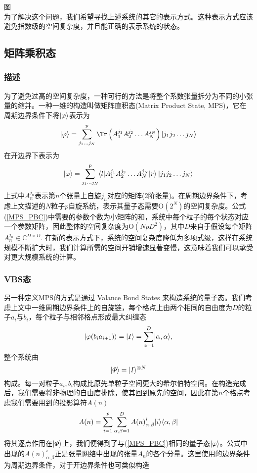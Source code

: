 图\\

为了解决这个问题，我们希望寻找上述系统的其它的表示方式。这种表示方式应该避免指数级的空间复杂度，并且能正确的表示系统的状态。

\subsection{矩阵乘积态}
\subsubsection{描述}

为了避免过高的空间复杂度，一种可行的方法是将整个系数张量拆分为不同的小张量的缩并。一种一维的构造叫做矩阵直积态(Matrix Product State, MPS)，它在周期边界条件下将$\lvert\varphi\rangle$表示为
\begin{equation}\label{MPS_PBC}
\ket{\varphi} = \sum_{j_1\dots j_N}^p \Tr\left( A_{1}^{j_1} A_{2}^{j_2}\dots A_{N}^{j_N} \right)\ket{j_1 j_2\dots j_N}
\end{equation}
在开边界下表示为
\begin{equation}
\lvert\varphi\rangle = \sum_{j_1\dots j_N}^p \langle l\rvert A_{1}^{j_1} A_{2}^{j_2}\dots A_{N}^{j_N}\lvert r\rangle \:
\lvert j_1 j_2\dots j_N\rangle
\end{equation}
上式中$A_n^{j_n}$表示第$n$个张量上自旋$j_n$对应的矩阵(2阶张量)。在周期边界条件下，考虑上文描述的$N$粒子$p$自旋系统，表示其量子态需要$\mathrm{O}\left(2^N\right)$的空间复杂度。公式(\ref{MPS_PBC})中需要的参数个数为小矩阵的和，系统中每个粒子的每个状态对应一个参数矩阵，因此整体的空间复杂度为$\mathrm{O}(NpD^2)$，其中$D$来自于假设每个矩阵$A_{n}^{j_n}\in \mathbb{C}^{D\times D}$. 在新的表示方式下，系统的空间复杂度降低为多项式级，这样在系统规模不断扩大时，我们计算所需的空间开销增速显著变慢，这意味着我们可以承受对更大规模系统的计算。


\subsubsection{VBS态}
另一种定义MPS的方式是通过 Valance Bond States \cite[8]{dongZhangLiangWangLuoSuanFaCongBoSeZiXiTongDaoFeiMiZiXiTong2017}来构造系统的量子态。我们考虑上文中一维周期边界条件上的自旋链，每个格点上由两个相同的自由度为$D$的粒子$a_i$与$b_i$，每个粒子与相邻格点形成最大纠缠态
\begin{equation}
\lvert\varphi(b_i a_{i+1})\rangle = \lvert I\rangle = \sum_{\alpha=1}^D \lvert\alpha,\alpha\rangle,
\end{equation}
整个系统由
\begin{equation}
\lvert\varPhi\rangle = \lvert I\rangle^{\otimes N}
\end{equation}
构成。每一对粒子$a_i,b_i$构成比原先单粒子空间更大的希尔伯特空间。在构造完成后，我们需要将非物理的自由度排除，使其回到原先的空间，因此在第$n$个格点考虑我们需要用到的投影算符$A(n)$
\begin{equation}
A(n) = \sum_{i=1}^p\sum_{\alpha,\beta=1}^D {A(n)}^i_{\alpha,\beta}\lvert i\rangle\langle\alpha,\beta\rvert
\end{equation}
将其逐点作用在$\lvert\varPhi\rangle$上\cite[16]{bridgemanHandwavingInterpretiveDance2017}，我们便得到了与(\ref{MPS_PBC})相同的量子态$\lvert\varphi\rangle$。公式中出现的$A(n)^i_{\alpha,\beta}$正是张量网络中出现的张量$A_n$的各个分量。这里使用的边界条件为周期边界条件，对于开边界条件也可类似构造

